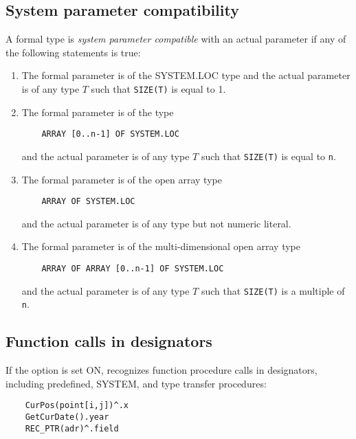 \subsection{System parameter compatibility}\label{m2:ISO:comp:system}

A formal type is {\em system parameter compatible} with an actual
parameter if any of the following statements is true:
\renewcommand{\theenumi}{\alph{enumi}}
\begin{enumerate}
\item   The formal parameter is of the SYSTEM.LOC type
        and the actual
        parameter is of any type $T$ such that {\tt SIZE(T)} is equal to 1.

\item   The formal parameter is of the type

\verb'    ARRAY [0..n-1] OF SYSTEM.LOC'

        and the actual parameter is of any type $T$ such
        that {\tt SIZE(T)} is equal to {\tt n}.

\item   The formal parameter is of the open array type

\verb'    ARRAY OF SYSTEM.LOC'

        and the actual parameter is of any type but not numeric literal.

\item   The formal parameter is of the multi-dimensional open array type

\verb'    ARRAY OF ARRAY [0..n-1] OF SYSTEM.LOC'

        and the actual parameter is of any type $T$ such
        that {\tt SIZE(T)} is a multiple of {\tt n}.

\end{enumerate}
\renewcommand{\theenumi}{\arabic{enumi}}

\iftopspeed\else
\subsection{Function calls in designators}

If the option  is set ON, \xds{} recognizes function 
procedure calls in designators, including  predefined, SYSTEM, and type 
transfer procedures:

\begin{verbatim}
    CurPos(point[i,j])^.x
    GetCurDate().year
    REC_PTR(adr)^.field
\end{verbatim}

